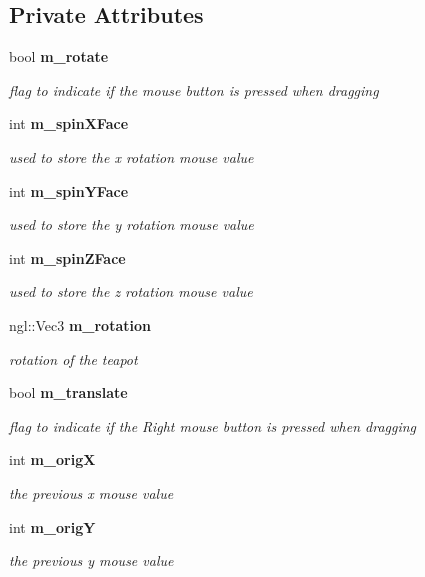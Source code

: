 \subsection*{Private Attributes}
\begin{DoxyCompactItemize}
\item 
bool {\bf m\-\_\-rotate}
\begin{DoxyCompactList}\small\item\em flag to indicate if the mouse button is pressed when dragging \end{DoxyCompactList}\item 
int {\bf m\-\_\-spin\-X\-Face}
\begin{DoxyCompactList}\small\item\em used to store the x rotation mouse value \end{DoxyCompactList}\item 
int {\bf m\-\_\-spin\-Y\-Face}
\begin{DoxyCompactList}\small\item\em used to store the y rotation mouse value \end{DoxyCompactList}\item 
int {\bf m\-\_\-spin\-Z\-Face}
\begin{DoxyCompactList}\small\item\em used to store the z rotation mouse value \end{DoxyCompactList}\item 
ngl\-::\-Vec3 {\bf m\-\_\-rotation}
\begin{DoxyCompactList}\small\item\em rotation of the teapot \end{DoxyCompactList}\item 
bool {\bf m\-\_\-translate}
\begin{DoxyCompactList}\small\item\em flag to indicate if the Right mouse button is pressed when dragging \end{DoxyCompactList}\item 
int {\bf m\-\_\-orig\-X}
\begin{DoxyCompactList}\small\item\em the previous x mouse value \end{DoxyCompactList}\item 
int {\bf m\-\_\-orig\-Y}
\begin{DoxyCompactList}\small\item\em the previous y mouse value \end{DoxyCompactList}\item 

\end{DoxyCompactItemize}
